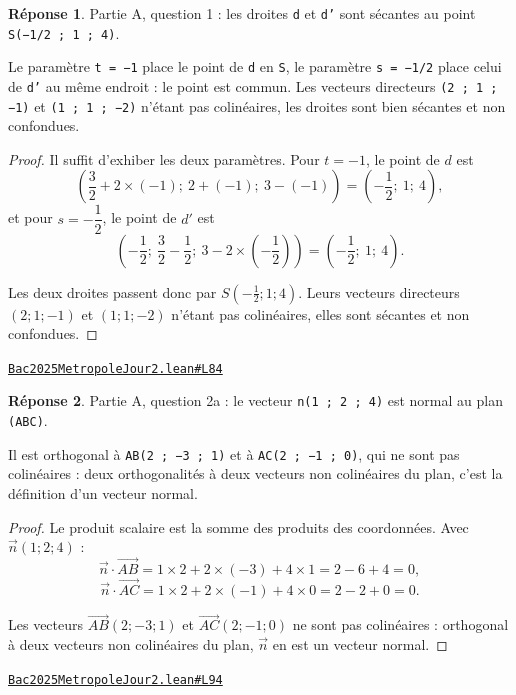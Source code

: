 \documentclass[11pt,a4paper]{article}
\theoremstyle{definition}
\theoremstyle{plain}
\theoremstyle{definition}
\newtheorem*{reponse}{Réponse}
\newcommand{\source}[2]{\par\smallskip\noindent\hfill{\footnotesize\href{#1}{\texttt{#2}}}\par\smallskip}
\begin{document}
\begin{reponse}
Partie A, question 1 : les droites \texttt{d} et \texttt{d'} sont sécantes au point
\texttt{S(−1/2 ; 1 ; 4)}.

Le paramètre \texttt{t = −1} place le point de \texttt{d} en \texttt{S}, le paramètre \texttt{s = −1/2} place celui
de \texttt{d'} au même endroit : le point est commun. Les vecteurs directeurs \texttt{(2 ; 1 ; −1)} et
\texttt{(1 ; 1 ; −2)} n'étant pas colinéaires, les droites sont bien sécantes et non
confondues.
\end{reponse}
\begin{proof}
Il suffit d'exhiber les deux paramètres. Pour $t = -1$, le point de $d$ est
\[ \left(\frac{3}{2} + 2 \times (-1) ;\ 2 + (-1) ;\ 3 - (-1)\right)
   = \left(-\frac{1}{2} ;\ 1 ;\ 4\right) , \]
et pour $s = -\dfrac{1}{2}$, le point de $d'$ est
\[ \left(-\frac{1}{2} ;\ \frac{3}{2} - \frac{1}{2} ;\ 3 - 2 \times \left(-\frac{1}{2}\right)\right)
   = \left(-\frac{1}{2} ;\ 1 ;\ 4\right) . \]

Les deux droites passent donc par $S\left(-\tfrac{1}{2} ; 1 ; 4\right)$. Leurs vecteurs
directeurs $(2 ; 1 ; -1)$ et $(1 ; 1 ; -2)$ n'étant pas colinéaires, elles sont sécantes
et non confondues.
\end{proof}
\source{https://github.com/Commutator-IO/learn-lean/blob/main/exams/2025/Bac2025MetropoleJour2.lean\#L84}{Bac2025MetropoleJour2.lean\#L84}

\begin{reponse}
Partie A, question 2a : le vecteur \texttt{n(1 ; 2 ; 4)} est normal au plan \texttt{(ABC)}.

Il est orthogonal à \texttt{AB(2 ; −3 ; 1)} et à \texttt{AC(2 ; −1 ; 0)}, qui ne sont pas colinéaires :
deux orthogonalités à deux vecteurs non colinéaires du plan, c'est la définition d'un
vecteur normal.
\end{reponse}
\begin{proof}
Le produit scalaire est la somme des produits des coordonnées. Avec
$\vec{n}(1 ; 2 ; 4)$ :
\[ \vec{n} \cdot \vec{AB} = 1 \times 2 + 2 \times (-3) + 4 \times 1 = 2 - 6 + 4 = 0 , \]
\[ \vec{n} \cdot \vec{AC} = 1 \times 2 + 2 \times (-1) + 4 \times 0 = 2 - 2 + 0 = 0 . \]

Les vecteurs $\vec{AB}(2 ; -3 ; 1)$ et $\vec{AC}(2 ; -1 ; 0)$ ne sont pas colinéaires :
orthogonal à deux vecteurs non colinéaires du plan, $\vec{n}$ en est un vecteur normal.
\end{proof}
\source{https://github.com/Commutator-IO/learn-lean/blob/main/exams/2025/Bac2025MetropoleJour2.lean\#L94}{Bac2025MetropoleJour2.lean\#L94}
\end{document}
